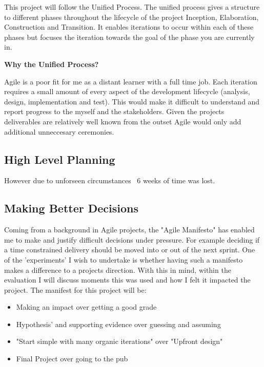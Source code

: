 This project will follow the Unified Process. The unified process gives a
structure to different phases throughout the lifecycle of the project
Inception, Elaboration, Construction and Transition. It enables iterations
to occur within each of these phases but focuses the iteration towards the
goal of the phase you are currently in.


\textbf{Why the Unified Process?}

Agile is a poor fit for me as a distant learner with a
full time job. Each iteration requires a small amount of every aspect of the
development lifecycle (analysis, design, implementation and test). This would
make it difficult to understand and report progress to the myself and the
stakeholders. Given the projects deliverables are relatively well known from
the outset Agile would only add additional unneccesary ceremonies.




\subsection{High Level Planning}

However
due to unforseen circumstances ~6 weeks of time was lost.

\subsection{Making Better Decisions}
Coming from a background in Agile projects, the "Agile Manifesto" has enabled
me to make and justify difficult decisions under pressure. For example deciding
 if a time constrained delivery should be moved into or out of the next
 sprint. One of the 'experiments' I wish to undertake is whether having such a
 manifesto makes a difference to a projects direction. With this in mind,
 within the evaluation I will discuss moments this was used and how I felt
 it impacted the project. The manifest for this project will be:
\begin{itemize}
  \item Making an impact over getting a good grade
  \item Hypothesis’ and supporting evidence over guessing and assuming
  \item "Start simple with many organic iterations" over "Upfront design"
  \item Final Project over going to the pub
\end{itemize}

